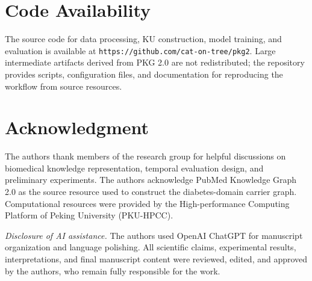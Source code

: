 \documentclass[conference]{IEEEtran}
\begin{document}
\section*{Code Availability}

The source code for data processing, KU construction, model training, and evaluation is available at \texttt{https://github.com/cat-on-tree/pkg2}. Large intermediate artifacts derived from PKG 2.0 are not redistributed; the repository provides scripts, configuration files, and documentation for reproducing the workflow from source resources.

\section*{Acknowledgment}

The authors thank members of the research group for helpful discussions on biomedical knowledge representation, temporal evaluation design, and preliminary experiments. The authors acknowledge PubMed Knowledge Graph 2.0 as the source resource used to construct the diabetes-domain carrier graph. Computational resources were provided by the High-performance Computing Platform of Peking University (PKU-HPCC).

\textit{Disclosure of AI assistance.} The authors used OpenAI ChatGPT for manuscript organization and language polishing. All scientific claims, experimental results, interpretations, and final manuscript content were reviewed, edited, and approved by the authors, who remain fully responsible for the work.



\end{document}

